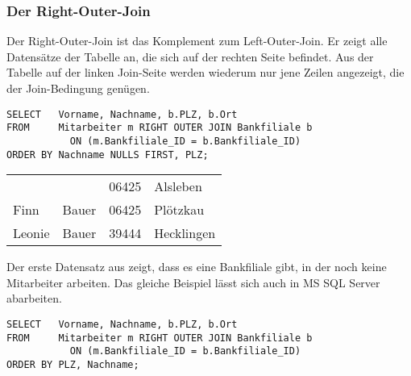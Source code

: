 \subsubsection{Der Right-Outer-Join}
Der Right-Outer-Join ist das Komplement zum Left-Outer-Join. Er zeigt alle Datensätze der Tabelle an, die sich auf der rechten Seite befindet. Aus der Tabelle auf der linken Join-Seite werden wiederum nur jene Zeilen angezeigt, die der Join-Bedingung genügen.
\begin{lstlisting}[language=oracle_sql,caption={Ein Right-Outer-Join in Oracle},label=sql04_15]
SELECT   Vorname, Nachname, b.PLZ, b.Ort
FROM     Mitarbeiter m RIGHT OUTER JOIN Bankfiliale b
           ON (m.Bankfiliale_ID = b.Bankfiliale_ID)
ORDER BY Nachname NULLS FIRST, PLZ;
          \end{lstlisting}
\begin{center}
    \begin{small}
        \tablehead{}
        \tabletail {
        }
        \begin{oraclesql}
            \begin{supertabular}{llll}
                &  & 06425 & Alsleben \\
                Finn & Bauer & 06425 & Plötzkau \\
                Leonie & Bauer & 39444 & Hecklingen \\
            \end{supertabular}
        \end{oraclesql}
    \end{small}
\end{center}
Der erste Datensatz aus  zeigt, dass es eine Bankfiliale gibt, in der noch keine Mitarbeiter arbeiten. Das gleiche Beispiel lässt sich auch  in MS SQL Server abarbeiten.
\begin{lstlisting}[language=ms_sql,caption={Der gleiche Right-Outer-Join in MS SQL Server},label=sql04_16]
SELECT   Vorname, Nachname, b.PLZ, b.Ort
FROM     Mitarbeiter m RIGHT OUTER JOIN Bankfiliale b
           ON (m.Bankfiliale_ID = b.Bankfiliale_ID)
ORDER BY PLZ, Nachname;
          \end{lstlisting}
